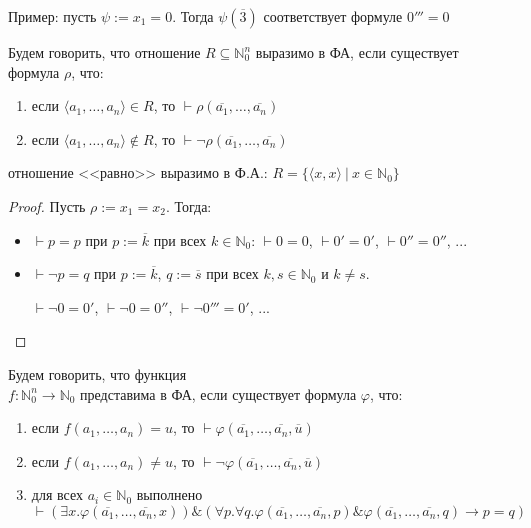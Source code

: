 Пример: пусть $\psi := x_1 = 0$.  Тогда $\psi(\overline{3})$ соответствует формуле $0''' = 0$

\begin{definition}

    Будем говорить, что отношение $R\subseteq \mathbb{N}^n_0$ выразимо в ФА,
если существует формула $\rho$, что:
\begin{enumerate}
\item если $\langle a_1,\dots,a_n \rangle \in R$, то $\vdash \rho(\overline{a_1},\dots,\overline{a_n})$
\item если $\langle a_1,\dots,a_n \rangle \notin R$, то $\vdash \neg\rho(\overline{a_1},\dots,\overline{a_n})$
\end{enumerate}
\end{definition}

\begin{theorem} отношение <<равно>> выразимо в Ф.А.:
$R = \{ \langle x,x \rangle\ |\ x \in \mathbb{N}_0 \}$
\end{theorem}

\begin{proof}
Пусть $\rho := x_1=x_2$.  Тогда:
\begin{itemize}
\item $\vdash p = p$ при $p := \overline{k}$ при всех $k \in \mathbb{N}_0$:  $\vdash 0=0$, $\vdash 0'=0'$, $\vdash 0''=0''$, ...
\item $\vdash \neg p = q$ при $p := \overline{k}$, $q := \overline{s}$ при всех $k,s \in \mathbb{N}_0$ и $k \ne s$.

 $\vdash \neg 0 = 0'$, $\vdash \neg 0 = 0''$, $\vdash \neg 0''' = 0'$, ...
\end{itemize}
\end{proof}

\begin{definition}
  Будем говорить, что функция \\$f: \mathbb{N}^n_0\to\mathbb{N}_0$ представима в ФА,
если существует формула $\varphi$, что:
\begin{enumerate}
\item если $f(a_1,\dots,a_n) = u$, то $\vdash \varphi(\overline{a_1},\dots,\overline{a_n},\overline{u})$
\item если $f(a_1,\dots,a_n) \ne u$, то $\vdash \neg\varphi(\overline{a_1},\dots,\overline{a_n},\overline{u})$
\item для всех $a_i \in \mathbb{N}_0$ выполнено $\vdash (\exists x.\varphi(\overline{a_1},\dots,\overline{a_n},x)) \&
   (\forall p.\forall q.\varphi(\overline{a_1},\dots,\overline{a_n},p)\& \varphi(\overline{a_1},\dots,\overline{a_n},q)\rightarrow p=q)$
\end{enumerate}
\end{definition}



